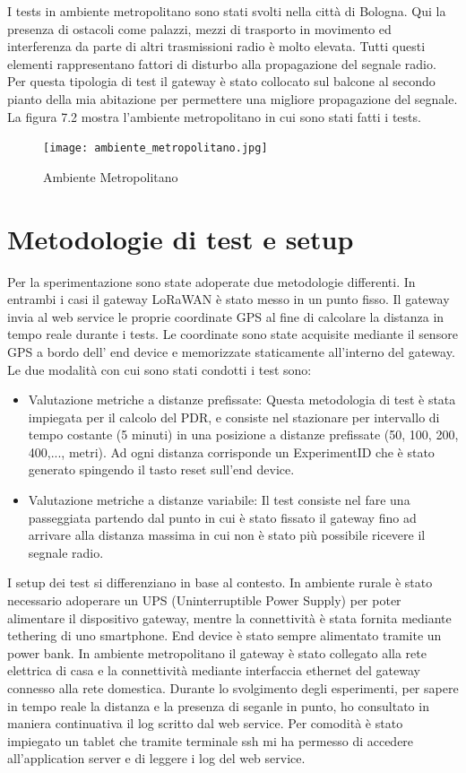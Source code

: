 \documentclass[12pt,a4paper,openright,twoside]{report}
\begin{document}
I tests in ambiente metropolitano sono stati svolti nella citt\`a di Bologna. Qui la presenza di ostacoli come palazzi, mezzi di trasporto in movimento ed interferenza da parte di altri trasmissioni radio \`e molto elevata. Tutti questi elementi rappresentano fattori di disturbo alla propagazione del segnale radio. Per questa tipologia di test il gateway \`e stato collocato sul balcone al secondo pianto della mia abitazione per permettere una migliore propagazione del segnale.
La figura 7.2 mostra l'ambiente metropolitano in cui sono stati fatti i tests.
\begin{figure}[h]                      
\begin{center} 
\texttt{[image: ambiente\_metropolitano.jpg]}
\caption[Ambiente Metropolitano]{Ambiente Metropolitano}\label{fig:prima}
\end{center}
\end{figure}

\section{Metodologie di test e setup}
Per la sperimentazione sono state adoperate due metodologie differenti. In entrambi i casi il gateway LoRaWAN \`e stato messo in un punto fisso. Il gateway invia al web service le proprie coordinate GPS al fine di calcolare la distanza in tempo reale durante i tests. Le coordinate sono state acquisite mediante il sensore GPS a bordo dell' end device e memorizzate staticamente all'interno del gateway.
Le due modalit\`a con cui sono stati condotti i test sono:
\begin{itemize}                       
\item Valutazione metriche a distanze prefissate: Questa metodologia di test \`e stata impiegata per il calcolo del PDR, e consiste nel stazionare per intervallo di tempo costante (5 minuti) in una posizione a distanze prefissate (50, 100, 200, 400,..., metri). Ad ogni distanza corrisponde un ExperimentID che \`e stato generato spingendo il tasto reset sull'end device.
\item Valutazione metriche a distanze variabile: Il test consiste nel fare una passeggiata partendo dal punto in cui \`e stato fissato il gateway fino ad arrivare alla distanza massima in cui non \`e stato pi\`u possibile ricevere il segnale radio.
\end{itemize}

I setup dei test si differenziano in base al contesto. In ambiente rurale \`e stato necessario adoperare un UPS (Uninterruptible Power Supply) per poter alimentare il dispositivo gateway, mentre la connettivit\`a \`e stata fornita mediante tethering di uno smartphone. End device \`e stato sempre alimentato tramite un power bank. 
In ambiente metropolitano il gateway \`e stato collegato alla rete elettrica di casa e la connettivit\`a mediante interfaccia ethernet del gateway connesso alla rete domestica.
Durante lo svolgimento degli esperimenti, per sapere in tempo reale la distanza e la presenza di seganle in punto, ho consultato in maniera continuativa il log scritto dal web service. Per comodit\`a \`e stato impiegato un tablet che tramite terminale ssh mi ha permesso di accedere all'application server e di leggere i log del web service.
\end{document}
